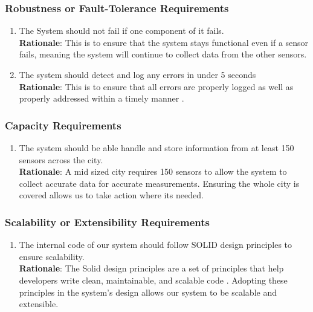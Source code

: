 \documentclass[]{article}
\begin{document}
\subsubsection{Robustness or Fault-Tolerance Requirements}
\label{ssub:robustness_or_fault_tolerance_requirements}
\begin{enumerate}[{PR-RFT}1. ]
	\item The System should not fail if one component of it fails.\\
    \textbf{Rationale}: This is to ensure that the system stays functional even if a sensor fails, meaning the system will continue to collect data from the other sensors.
    \item The system should detect and log any errors in under 5 seconds\\
    \textbf{Rationale}: This is to ensure that all errors are properly logged as well as properly addressed within a timely manner \textcolor{red}{\cite{PRRFT2}}.
\end{enumerate}

\subsubsection{Capacity Requirements}
\label{ssub:capacity_requirements}
\begin{enumerate}[{PR-C}1. ]
	\item The system should be able handle and store information from at least 150 sensors across the city.\\
    \textbf{Rationale}: A mid sized city requires 150 sensors \cite{english2020} to allow the system to collect accurate data for accurate measurements. Ensuring the whole city is covered allows us to take action where its needed.
\end{enumerate}

\subsubsection{Scalability or Extensibility Requirements}
\label{ssub:scalability_or_extensibility_requirements}
\begin{enumerate}[{PR-SE}1. ]
	\item The internal code of our system should follow SOLID design principles to ensure scalability.\\ 
    \textbf{Rationale}: The Solid design principles are a set of principles that help developers write clean, maintainable, and scalable code \cite{gorai2024}. Adopting these principles in the system's design allows our system to be scalable and extensible. 
\end{enumerate}
\end{document}
